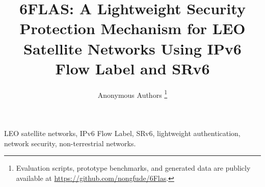 \documentclass[journal]{IEEEtran}
\title{6FLAS: A Lightweight Security Protection Mechanism for LEO Satellite Networks Using IPv6 Flow Label and SRv6}
\author{Anonymous Authors%
\thanks{Evaluation scripts, prototype benchmarks, and generated data are publicly available at \url{https://github.com/nongfude/6Flas}.}%
}
\theoremstyle{plain}
\theoremstyle{definition}
\theoremstyle{remark}
\begin{document}
\maketitle

\begin{abstract}

\end{abstract}

\begin{IEEEkeywords}
LEO satellite networks, IPv6 Flow Label, SRv6, lightweight authentication, network security, non-terrestrial networks.
\end{IEEEkeywords}










\end{document}
